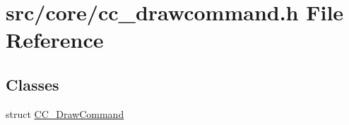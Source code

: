 \hypertarget{a00205}{\section{src/core/cc\-\_\-drawcommand.h File Reference}
\label{a00205}
}
\subsection*{Classes}
\begin{DoxyCompactItemize}
\item 
struct \hyperlink{a00031}{C\-C\-\_\-\-Draw\-Command}
\end{DoxyCompactItemize}

